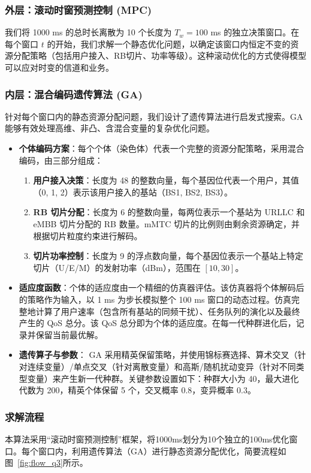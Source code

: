 \subsubsection{外层：滚动时窗预测控制 (MPC)}
我们将 1000 ms 的总时长离散为 10 个长度为 $T_w=100$ ms 的独立决策窗口。在每个窗口 $t$ 的开始，我们求解一个静态优化问题，以确定该窗口内恒定不变的资源分配策略（包括用户接入、RB切片、功率等级）。这种滚动优化的方式使得模型可以应对时变的信道和业务。


\subsubsection{内层：混合编码遗传算法 (GA)}
针对每个窗口内的静态资源分配问题，我们设计了遗传算法进行启发式搜索。GA 能够有效处理高维、非凸、含混合变量的复杂优化问题。
\begin{itemize}
  \item \textbf{个体编码方案}：每个个体（染色体）代表一个完整的资源分配策略，采用混合编码，由三部分组成：
  \begin{enumerate}
    \item \textbf{用户接入决策}：长度为 48 的整数向量，每个基因位代表一个用户，其值（0, 1, 2）表示该用户接入的基站（BS1, BS2, BS3）。
    \item \textbf{RB 切片分配}：长度为 6 的整数向量，每两位表示一个基站为 URLLC 和 eMBB 切片分配的 RB 数量。mMTC 切片的比例则由剩余资源确定，并根据切片粒度约束进行解码。
    \item \textbf{切片功率控制}：长度为 9 的浮点数向量，每个基因位表示一个基站上特定切片（U/E/M）的发射功率（dBm），范围在 $[10, 30]$。
  \end{enumerate}
  \item \textbf{适应度函数}：个体的适应度由一个精细的仿真器评估。该仿真器将个体解码后的策略作为输入，以 1 ms 为步长模拟整个 100 ms 窗口的动态过程。仿真完整地计算了用户速率（包含所有基站的同频干扰）、任务队列的演化以及最终产生的 QoS 总分。该 QoS 总分即为个体的适应度。在每一代种群进化后，记录并保留当前最优解。
  \item \textbf{遗传算子与参数}：
  GA 采用精英保留策略，并使用锦标赛选择、算术交叉（针对连续变量）/单点交叉（针对离散变量）和高斯/随机扰动变异（针对不同类型变量）来产生新一代种群。关键参数设置如下：种群大小为 40，最大进化代数为 200，精英个体保留 5 个，交叉概率 0.8，变异概率 0.3。
\end{itemize}
\subsubsection{求解流程}
本算法采用“滚动时窗预测控制”框架，将1000ms划分为10个独立的100ms优化窗口。每个窗口内，利用遗传算法（GA）进行静态资源分配优化，简要流程如图~\ref{fig:flow_q3}所示。

